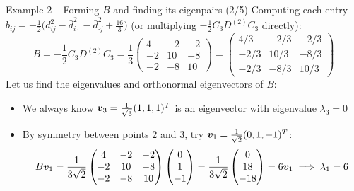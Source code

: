 \documentclass[aspectratio=169]{beamer}\usepackage[]{graphicx}\usepackage[]{xcolor}
\begin{document}
\begin{frame}{Example 2 -- Forming $B$ and finding its eigenpairs (2/5)}
Computing each entry $b_{ij} = -\frac{1}{2}\big(d_{ij}^2 - \bar{d}_{i\cdot}^2 - \bar{d}_{\cdot j}^2 + \frac{16}{3}\big)$ (or multiplying $-\frac{1}{2}C_3 D^{(2)} C_3$ directly):
\[
B = -\frac{1}{2}C_3 D^{(2)} C_3 = \frac{1}{3}\begin{pmatrix}
4 & -2 & -2 \\
-2 & 10 & -8 \\
-2 & -8 & 10
\end{pmatrix}
= \begin{pmatrix}
4/3 & -2/3 & -2/3 \\
-2/3 & 10/3 & -8/3 \\
-2/3 & -8/3 & 10/3
\end{pmatrix}
\]
\vfill
Let us find the eigenvalues and orthonormal eigenvectors of $B$:
\begin{itemize}
\item We always know $\bm{v}_3 = \frac{1}{\sqrt{3}}(1,1,1)^T$ is an eigenvector with eigenvalue $\lambda_3 = 0$
\item By symmetry between points $2$ and $3$, try $\bm{v}_1 = \frac{1}{\sqrt{2}}(0, 1, -1)^T$:
\[
B\bm{v}_1 = \frac{1}{3\sqrt{2}}\begin{pmatrix} 4 & -2 & -2 \\ -2 & 10 & -8 \\ -2 & -8 & 10 \end{pmatrix}\begin{pmatrix} 0 \\ 1 \\ -1 \end{pmatrix}
= \frac{1}{3\sqrt{2}}\begin{pmatrix} 0 \\ 18 \\ -18 \end{pmatrix} = 6\bm{v}_1 \implies \lambda_1 = 6
\]
\end{itemize}
\end{frame}
\end{document}
